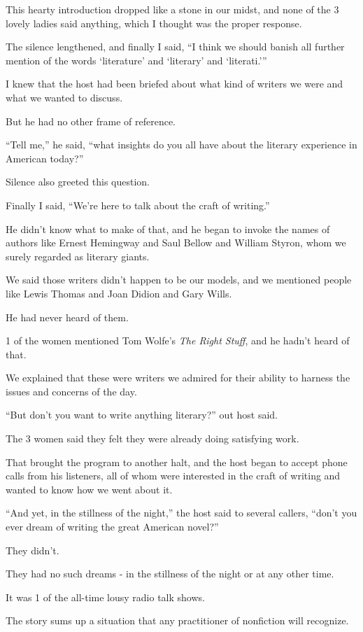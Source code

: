 \documentclass{book}
\numberwithin{equation}{section}
\begin{document}
This hearty introduction dropped like a stone in our midst, and none of the 3 lovely ladies said anything, which I thought was the proper response.

%
The silence lengthened, and finally I said, ``I think we should banish all further mention of the words `literature' and `literary' and `literati.'''

I knew that the host had been briefed about what kind of writers we were and what we wanted to discuss.

But he had no other frame of reference.

``Tell me,'' he said, ``what insights do you all have about the literary experience in American today?''

Silence also greeted this question.

Finally I said, ``We're here to talk about the craft of writing.''

He didn't know what to make of that, and he began to invoke the names of authors like Ernest Hemingway and Saul Bellow and William Styron, whom we surely regarded as literary giants.

We said those writers didn't happen to be our models, and we mentioned people like Lewis Thomas and Joan Didion and Gary Wills.

He had never heard of them.

1 of the women mentioned Tom Wolfe's \textit{The Right Stuff}, and he hadn't heard of that.

We explained that these were writers we admired for their ability to harness the issues and concerns of the day.

%
``But don't you want to write anything literary?'' out host said.

The 3 women said they felt they were already doing satisfying work.

That brought the program to another halt, and the host began to accept phone calls from his listeners, all of whom were interested in the craft of writing and wanted to know how we went about it.

``And yet, in the stillness of the night,'' the host said to several callers, ``don't you ever dream of writing the great American novel?''

They didn't.

They had no such dreams - in the stillness of the night or at any other time.

It was 1 of the all-time lousy radio talk shows.

%
The story sums up a situation that any practitioner of nonfiction will recognize.
\end{document}
